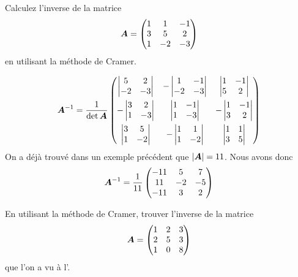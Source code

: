 \begin{exemple}
Calculez l'inverse de la matrice
\[
\boldsymbol{A} = 
\begin{pmatrix}
1 & 1 & -1\\
3 & 5 & 2\\
1 & -2& -3
\end{pmatrix}
\]
en utilisant la méthode de Cramer.
\solution

\[
\boldsymbol{A}^{-1} = \frac{1}{\det\boldsymbol{A}} \begin{pmatrix}
\begin{vmatrix} 5 & 2\\ -2&-3 \end{vmatrix} & 
-\begin{vmatrix} 1 & -1\\ -2&-3 \end{vmatrix} & 
\begin{vmatrix} 1 & -1\\ 5 & 2 \end{vmatrix} \\[10pt]
-\begin{vmatrix} 3 & 2\\ 1&-3 \end{vmatrix} & 
\begin{vmatrix} 1 & -1\\ 1&-3 \end{vmatrix} & 
-\begin{vmatrix} 1 & -1\\ 3 & 2 \end{vmatrix}   \\[10pt]
\begin{vmatrix} 3 & 5\\ 1&-2 \end{vmatrix}& 
-\begin{vmatrix} 1 & 1\\ 1&-2 \end{vmatrix} & 
\begin{vmatrix} 1 & 1\\ 3 & 5 \end{vmatrix} 
\end{pmatrix}
\]
On a déjà trouvé dans un exemple précédent que $|\boldsymbol{A}|=11$. Nous avons donc
\[
\boldsymbol{A}^{-1} = \frac{1}{11} \begin{pmatrix}
-11 & 5 & 7 \\
11 & -2 & -5\\
-11 & 3 & 2
\end{pmatrix}
\]
\end{exemple}

\begin{exerciceC}
En utilisant la méthode de Cramer, trouver l'inverse de la matrice
\[
\boldsymbol{A} = \begin{pmatrix}
1 & 2 & 3 \\
2 & 5 & 3 \\
1 & 0 & 8
\end{pmatrix}
\]
que l'on a vu à l'.
\end{exerciceC}



